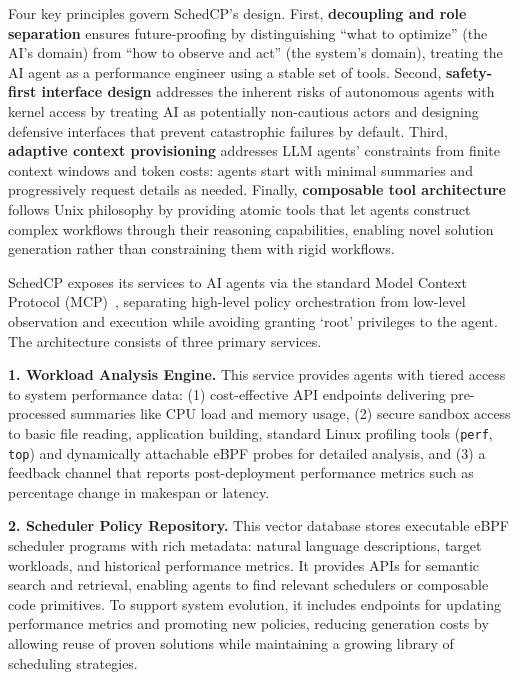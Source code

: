 \documentclass[preprint]{article}
\newcommand{\sys}{SchedCP\xspace}
\begin{document}
Four key principles govern \sys's design. First, \textbf{decoupling and role separation} ensures future-proofing by distinguishing ``what to optimize'' (the AI's domain) from ``how to observe and act'' (the system's domain), treating the AI agent as a performance engineer using a stable set of tools. Second, \textbf{safety-first interface design} addresses the inherent risks of autonomous agents with kernel access by treating AI as potentially non-cautious actors and designing defensive interfaces that prevent catastrophic failures by default. Third, \textbf{adaptive context provisioning} addresses LLM agents' constraints from finite context windows and token costs: agents start with minimal summaries and progressively request details as needed. Finally, \textbf{composable tool architecture} follows Unix philosophy by providing atomic tools that let agents construct complex workflows through their reasoning capabilities, enabling novel solution generation rather than constraining them with rigid workflows.

\sys exposes its services to AI agents via the standard Model Context Protocol (MCP)~\cite{anthropic2024mcp}, separating high-level policy orchestration from low-level observation and execution while avoiding granting `root' privileges to the agent. The architecture consists of three primary services.

\textbf{1. Workload Analysis Engine.} This service provides agents with tiered access to system performance data: (1) cost-effective API endpoints delivering pre-processed summaries like CPU load and memory usage, (2) secure sandbox access to basic file reading, application building, standard Linux profiling tools (\texttt{perf}, \texttt{top}) and dynamically attachable eBPF probes for detailed analysis, and (3) a feedback channel that reports post-deployment performance metrics such as percentage change in makespan or latency.

\textbf{2. Scheduler Policy Repository.} This vector database stores executable eBPF scheduler programs with rich metadata: natural language descriptions, target workloads, and historical performance metrics. It provides APIs for semantic search and retrieval, enabling agents to find relevant schedulers or composable code primitives. To support system evolution, it includes endpoints for updating performance metrics and promoting new policies, reducing generation costs by allowing reuse of proven solutions while maintaining a growing library of scheduling strategies.
\end{document}
